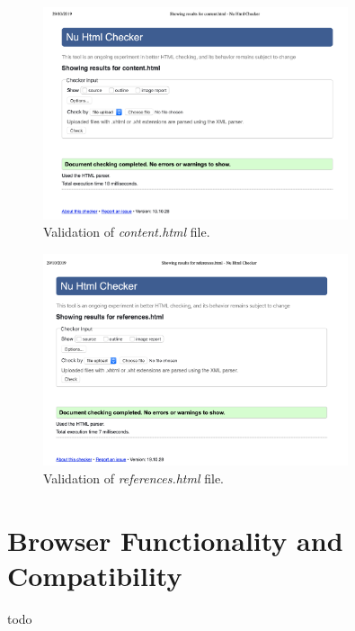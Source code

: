 \documentclass[letterpaper,12pt]{article}
\begin{document}
\begin{appendices}
\begin{figure}[h] 
\centerline{\includegraphics[width=0.8\textwidth]{report/images/validation-content.png}}
\caption{\label{fig:validation-content.png}Validation of \textit{content.html} file.}
\end{figure}

\begin{figure}[h] 
\centerline{\includegraphics[width=0.8\textwidth]{report/images/validation-references.png}}
\caption{\label{fig:validation-references.png}Validation of \textit{references.html} file.}
\end{figure}

\clearpage
\section{Browser Functionality and Compatibility}
todo

\end{appendices}
\end{document}
